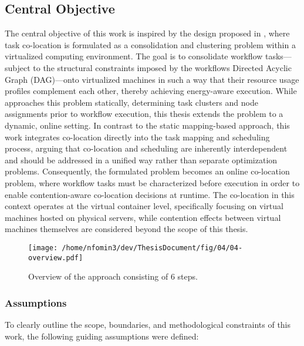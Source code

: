 \subsection{Central Objective}
\label{sec:problem_statement}
The central objective of this work is inspired by the design proposed in \cite{5644899}, where task co-location is formulated as a consolidation and clustering problem within a virtualized computing environment. The goal is to consolidate workflow tasks—subject to the structural constraints imposed by the workflows Directed Acyclic Graph (DAG)—onto virtualized machines in such a way that their resource usage profiles complement each other, thereby achieving energy-aware execution. While \cite{5644899} approaches this problem statically, determining task clusters and node assignments prior to workflow execution, this thesis extends the problem to a dynamic, online setting.
In contrast to the static mapping-based approach, this work integrates co-location directly into the task mapping and scheduling process, arguing that co-location and scheduling are inherently interdependent and should be addressed in a unified way rather than separate optimization problems. Consequently, the formulated problem becomes an online co-location problem, where workflow tasks must be characterized before execution in order to enable contention-aware co-location decisions at runtime. The co-location in this context operates at the virtual container level, specifically focusing on virtual machines hosted on physical servers, while contention effects between virtual machines themselves are considered beyond the scope of this thesis.

\begin{figure}[htbp]
    \centering
    \texttt{[image: /home/nfomin3/dev/ThesisDocument/fig/04/04-overview.pdf]} %
    \caption{Overview of the approach consisting of 6 steps.}
    \label{fig:approach_overview}
\end{figure}

\subsubsection{Assumptions}
\label{sec:assumptions}
To clearly outline the scope, boundaries, and methodological constraints of this work, the following guiding assumptions were defined:

